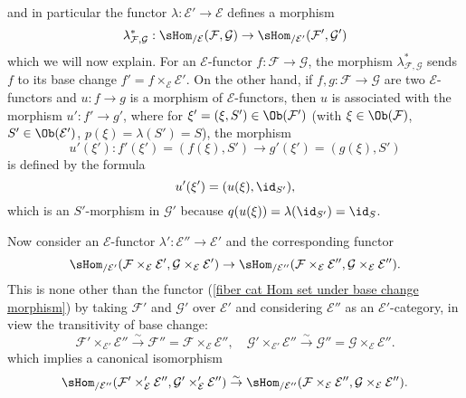 and in particular the functor $\lambda:\mathcal{E}'\to \mathcal{E}$ defines a morphism
\begin{equation}\label{fiber cat Hom set under base change morphism}
\lambda^*_{\mathcal{F},\mathcal{G}}:\sHom_{/\mathcal{E}}(\mathcal{F},\mathcal{G})\to \sHom_{/\mathcal{E}'}(\mathcal{F}',\mathcal{G}')
\end{equation}
which we will now explain. For an $\mathcal{E}$-functor $f:\mathcal{F}\to \mathcal{G}$, the morphism $\lambda^*_{\mathcal{F},\mathcal{G}}$ sends $f$ to its base change $f'=f\times_{\mathcal{E}}\mathcal{E}'$. On the other hand, if $f,g:\mathcal{F}\to \mathcal{G}$ are two $\mathcal{E}$-functors and $u:f\to g$ is a morphism of $\mathcal{E}$-functors, then $u$ is associated with the morphism $u':f'\to g'$, where for $\xi'=(\xi,S')\in\Ob(\mathcal{F}')$ (with $\xi\in\Ob(\mathcal{F})$, $S'\in\Ob(\mathcal{E}')$, $p(\xi)=\lambda(S')=S$), the morphism
\[u'(\xi'):f'(\xi')=(f(\xi),S')\to g'(\xi')=(g(\xi),S')\]
is defined by the formula
\[u'(\xi')=(u(\xi),\id_{S'}),\]
which is an $S'$-morphism in $\mathcal{G}'$ because $q(u(\xi))=\lambda(\id_{S'})=\id_S$.\par
Now consider an $\mathcal{E}$-functor $\lambda':\mathcal{E}''\to \mathcal{E}'$ and the corresponding functor
\[\sHom_{/\mathcal{E}'}(\mathcal{F}\times_\mathcal{E}\mathcal{E}',\mathcal{G}\times_\mathcal{E}\mathcal{E}')\to \sHom_{/\mathcal{E}''}(\mathcal{F}\times_\mathcal{E}\mathcal{E}'',\mathcal{G}\times_\mathcal{E}\mathcal{E}'').\]
This is none other than the functor (\ref{fiber cat Hom set under base change morphism}) by taking $\mathcal{F}'$ and $\mathcal{G}'$ over $\mathcal{E}'$ and considering $\mathcal{E}''$ as an $\mathcal{E}'$-category, in view the transitivity of base change:
\[\mathcal{F}'\times_{\mathcal{E}'}\mathcal{E}''\stackrel{\sim}{\to }\mathcal{F}''=\mathcal{F}\times_{\mathcal{E}}\mathcal{E}'',\quad \mathcal{G}'\times_{\mathcal{E}'}\mathcal{E}''\stackrel{\sim}{\to }\mathcal{G}''=\mathcal{G}\times_{\mathcal{E}}\mathcal{E}''.\]
which implies a canonical isomorphism
\[\sHom_{/\mathcal{E}''}(\mathcal{F}'\times_\mathcal{E}'\mathcal{E}'',\mathcal{G}'\times_\mathcal{E}'\mathcal{E}'')\stackrel{\sim}{\to }\sHom_{/\mathcal{E}''}(\mathcal{F}\times_\mathcal{E}\mathcal{E}'',\mathcal{G}\times_\mathcal{E}\mathcal{E}'').\]

